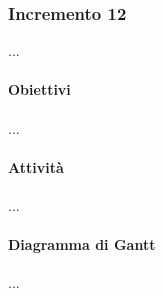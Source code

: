 \subsubsection{Incremento 12}
...
\paragraph{Obiettivi}
...
\paragraph{Attività}
...
\paragraph{Diagramma di Gantt}
...

